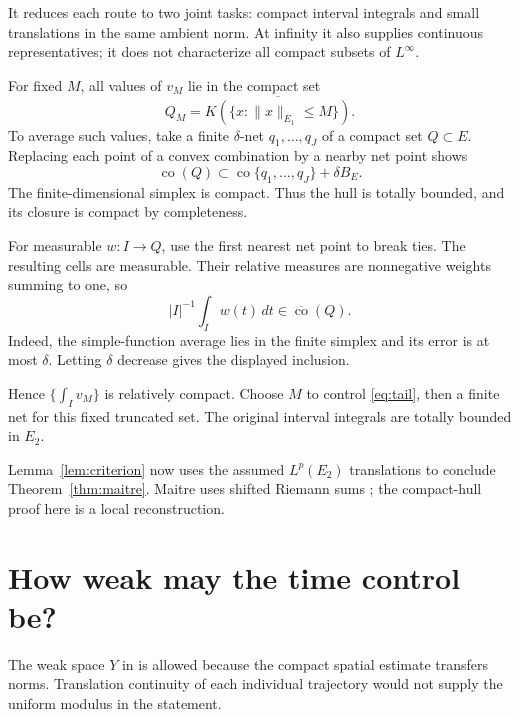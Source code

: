 \documentclass[12pt,reqno]{amsart}
\begin{document}
It reduces each route to two joint tasks: compact interval integrals and small translations in the same ambient norm. At infinity it also supplies continuous representatives; it does not characterize all compact subsets of $L^\infty$.

For fixed $M$, all values of $v_M$ lie in the compact set
\[
Q_M=\overline{K(\{x:\|x\|_{E_1}\le M\})}.
\]
To average such values, take a finite $\delta$-net $q_1,\ldots,q_J$ of a compact set $Q\subset E$. Replacing each point of a convex combination by a nearby net point shows
\[
\operatorname{co}(Q)\subset
\operatorname{co}\{q_1,\ldots,q_J\}+\delta B_E.
\]
The finite-dimensional simplex is compact. Thus the hull is totally bounded, and its closure is compact by completeness.

For measurable $w:I\to Q$, use the first nearest net point to break ties. The resulting cells are measurable. Their relative measures are nonnegative weights summing to one, so
\[
|I|^{-1}\int_Iw(t)\,dt\in\overline{\operatorname{co}}(Q).
\]
Indeed, the simple-function average lies in the finite simplex and its error is at most $\delta$. Letting $\delta$ decrease gives the displayed inclusion.

Hence $\{\int_Iv_M\}$ is relatively compact. Choose $M$ to control \eqref{eq:tail}, then a finite net for this fixed truncated set. The original interval integrals are totally bounded in $E_2$.

Lemma~\ref{lem:criterion} now uses the assumed $L^p(E_2)$ translations to conclude Theorem~\ref{thm:maitre}. Maitre uses shifted Riemann sums \cite[Lemma 2.3, pp.~1726--1730]{S-maitre}; the compact-hull proof here is a local reconstruction.

\section{How weak may the time control be?}

\begin{theorem}[Simon]\label{thm:simon}

\end{theorem}

The weak space $Y$ in \cite[Theorem 5, pp.~84--85]{S-simon} is allowed because the compact spatial estimate transfers norms. Translation continuity of each individual trajectory would not supply the uniform modulus in the statement.
\end{document}
